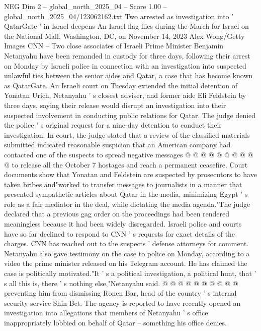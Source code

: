 \begin{textsample}{NEG Dim 2 – global\_north\_2025\_04 – Score 1.00 – global\_north\_2025\_04/123062162.txt}  \label{ex:f2_neg_126}
Two arrested as investigation into ' QatarGate ' in Israel deepens An Israel flag flies during the March for Israel on the National Mall, Washington, DC, on November 14, 2023 Alex Wong/Getty Images CNN -- Two close associates of Israeli Prime Minister Benjamin Netanyahu have been remanded in custody for three days, following their arrest on Monday by Israeli police in connection with an investigation into suspected unlawful ties between the senior aides and Qatar, a case that has become known as QatarGate.
An Israeli court on Tuesday extended the initial detention of Yonatan Urich, Netanyahu ' s closest adviser, and former aide Eli Feldstein by three days, saying their release would disrupt an investigation into their suspected involvement in conducting public relations for Qatar.
The judge denied the police ' s original request for a nine-day detention to conduct their investigation.
In court, the judge stated that a review of the classified materials submitted indicated reasonable suspicion that an American company had contacted one of the suspects to spread negative messages @ @ @ @ @ @ @ @ @ @ to release all the October 7 hostages and reach a permanent ceasefire.
Court documents show that Yonatan and Feldstein are suspected by prosecutors to have taken bribes and"worked to transfer messages to journalists in a manner that presented sympathetic articles about Qatar in the media, minimizing Egypt ' s role as a fair mediator in the deal, while dictating the media agenda."The judge declared that a previous gag order on the proceedings had been rendered meaningless because it had been widely disregarded.
Israeli police and courts have so far declined to respond to CNN ' s requests for exact details of the charges.
CNN has reached out to the suspects ' defense attorneys for comment.
Netanyahu also gave testimony on the case to police on Monday, according to a video the prime minister released on his Telegram account.
He has claimed the case is politically motivated."It ' s a political investigation, a political hunt, that ' s all this is, there ' s nothing else,"Netanyahu said. @ @ @ @ @ @ @ @ @ @ preventing him from dismissing Ronen Bar, head of the country ' s internal security service Shin Bet.
The agency is reported to have recently opened an investigation into allegations that members of Netanyahu ' s office inappropriately lobbied on behalf of Qatar -- something his office denies.

\end{textsample}
